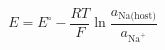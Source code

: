 \documentclass[preview]{standalone}
\begin{document}
\[E = E^\circ - \frac{RT}{F}\ln \frac{a_\text{Na(host)}}{a_{\text{Na}^+}} \tag{6.4}\]
\end{document}
